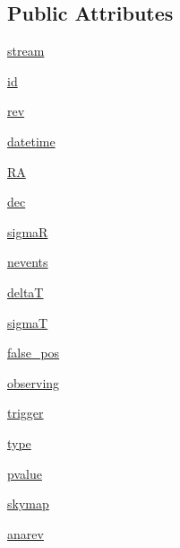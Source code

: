 \subsection*{Public Attributes}
\begin{DoxyCompactItemize}
\item 
\hyperlink{classamonpy_1_1dbase_1_1db__classes_1_1_alert_ac351cba0cc9faed58731140738d10232}{stream}
\item 
\hyperlink{classamonpy_1_1dbase_1_1db__classes_1_1_alert_a3fbd21dde44ba9a6900e7c705fe1ac92}{id}
\item 
\hyperlink{classamonpy_1_1dbase_1_1db__classes_1_1_alert_aec0c9ca7bd4e69b38d501926ff93c259}{rev}
\item 
\hyperlink{classamonpy_1_1dbase_1_1db__classes_1_1_alert_ad2477bf8f38ef6e732880c14598934dc}{datetime}
\item 
\hyperlink{classamonpy_1_1dbase_1_1db__classes_1_1_alert_a5bf8ccdec5173b9ee4359fa1fe31827f}{R\-A}
\item 
\hyperlink{classamonpy_1_1dbase_1_1db__classes_1_1_alert_a971b1ce9cb028f39ad83c2aa8173385f}{dec}
\item 
\hyperlink{classamonpy_1_1dbase_1_1db__classes_1_1_alert_a87c586f9003da0f1fde613020fa94b6a}{sigma\-R}
\item 
\hyperlink{classamonpy_1_1dbase_1_1db__classes_1_1_alert_a315b616f084b56318fdd685fb73a7093}{nevents}
\item 
\hyperlink{classamonpy_1_1dbase_1_1db__classes_1_1_alert_ad8332cbb384c9623c60bc5ac2466dfcb}{delta\-T}
\item 
\hyperlink{classamonpy_1_1dbase_1_1db__classes_1_1_alert_a3cb6c2dbbacf6b0abb2ccfc04f9c8b54}{sigma\-T}
\item 
\hyperlink{classamonpy_1_1dbase_1_1db__classes_1_1_alert_a905c3768330fdf5753654c6c39259bbb}{false\-\_\-pos}
\item 
\hyperlink{classamonpy_1_1dbase_1_1db__classes_1_1_alert_a4734419472d0ed5c05acbd74f8a1ea63}{observing}
\item 
\hyperlink{classamonpy_1_1dbase_1_1db__classes_1_1_alert_ae7cb911f5a8c43290bc5f7263abbcfb0}{trigger}
\item 
\hyperlink{classamonpy_1_1dbase_1_1db__classes_1_1_alert_aab97b4bd290097eba5b8df6ca82a484d}{type}
\item 
\hyperlink{classamonpy_1_1dbase_1_1db__classes_1_1_alert_a4022fe5b40d0625fc2e97b2f4ee09a44}{pvalue}
\item 
\hyperlink{classamonpy_1_1dbase_1_1db__classes_1_1_alert_aa1a842a15827d212233963ceea89fb0c}{skymap}
\item 
\hyperlink{classamonpy_1_1dbase_1_1db__classes_1_1_alert_ae9e6b4386e95cb1a8f9c911b8dece0f6}{anarev}
\end{DoxyCompactItemize}
